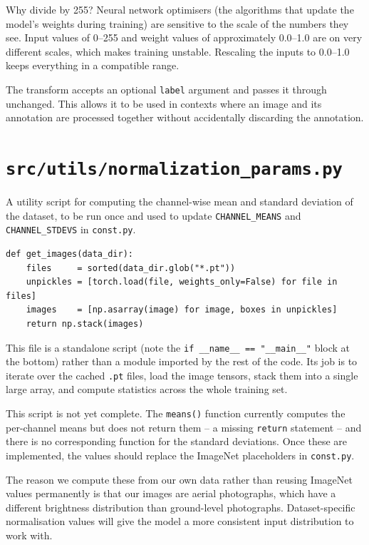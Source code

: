 \documentclass[11pt, a4paper]{article}
\newenvironment{note}{%
  \begin{tcolorbox}[
    colback=notebg, colframe=noteframe,
    fonttitle=\bfseries, title=Note,
    breakable, enhanced
  ]
}{%
  \end{tcolorbox}
}
\newenvironment{intuition}{%
  \begin{tcolorbox}[
    colback=warnbg, colframe=warnframe,
    fonttitle=\bfseries, title=Why does the code do this?,
    breakable, enhanced
  ]
}{%
  \end{tcolorbox}
}
\newenvironment{filebox}[1]{%
  \begin{tcolorbox}[
    colback=filebg, colframe=fileframe,
    fonttitle=\bfseries\ttfamily, title=#1,
    breakable, enhanced
  ]
}{%
  \end{tcolorbox}
}
\begin{document}
\begin{intuition}
  Why divide by 255? Neural network optimisers (the algorithms that update
  the model's weights during training) are sensitive to the scale of the
  numbers they see. Input values of 0--255 and weight values of approximately
  0.0--1.0 are on very different scales, which makes training unstable.
  Rescaling the inputs to 0.0--1.0 keeps everything in a compatible range.
\end{intuition}

The transform accepts an optional \texttt{label} argument and passes it
through unchanged. This allows it to be used in contexts where an image and
its annotation are processed together without accidentally discarding the
annotation.

\section{\texttt{src/utils/normalization\_params.py}}

\begin{filebox}{src/utils/normalization\_params.py}
  A utility script for computing the channel-wise mean and standard deviation
  of the dataset, to be run once and used to update \texttt{CHANNEL\_MEANS} and
  \texttt{CHANNEL\_STDEVS} in \texttt{const.py}.
\end{filebox}

\begin{lstlisting}
def get_images(data_dir):
    files     = sorted(data_dir.glob("*.pt"))
    unpickles = [torch.load(file, weights_only=False) for file in files]
    images    = [np.asarray(image) for image, boxes in unpickles]
    return np.stack(images)
\end{lstlisting}

This file is a standalone script (note the \texttt{if \_\_name\_\_ == "\_\_main\_\_"} block at the bottom) rather than a module imported by the rest of
the code. Its job is to iterate over the cached \texttt{.pt} files, load the
image tensors, stack them into a single large array, and compute statistics
across the whole training set.

\begin{note}
  This script is not yet complete. The \texttt{means()} function currently
  computes the per-channel means but does not return them -- a missing
  \texttt{return} statement -- and there is no corresponding function for the
  standard deviations. Once these are implemented, the values should replace
  the ImageNet placeholders in \texttt{const.py}.

  The reason we compute these from our own data rather than reusing ImageNet
  values permanently is that our images are aerial photographs, which have a
  different brightness distribution than ground-level photographs.
  Dataset-specific normalisation values will give the model a more consistent
  input distribution to work with.
\end{note}
\end{document}
